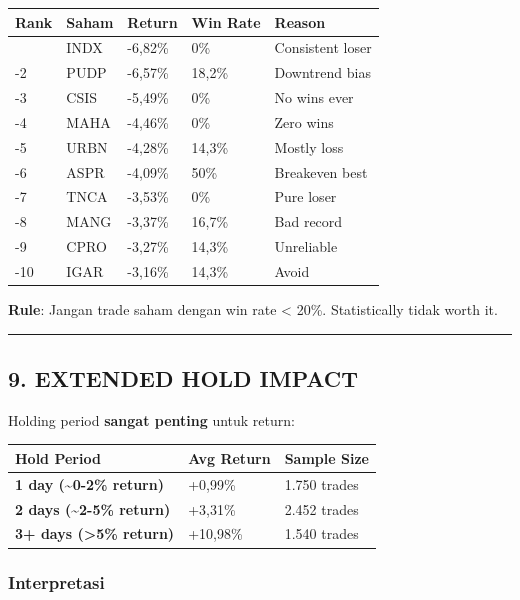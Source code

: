 \documentclass[
  10pt,
  a4paper,
]{article}
\begin{document}
\begin{longtable}[]{@{}lllll@{}}
\toprule\noalign{}
Rank & Saham & Return & Win Rate & Reason \\
\midrule\noalign{}
\endhead
\bottomrule\noalign{}
\endlastfoot
-1 & INDX & -6,82\% & 0\% & Consistent loser \\
-2 & PUDP & -6,57\% & 18,2\% & Downtrend bias \\
-3 & CSIS & -5,49\% & 0\% & No wins ever \\
-4 & MAHA & -4,46\% & 0\% & Zero wins \\
-5 & URBN & -4,28\% & 14,3\% & Mostly loss \\
-6 & ASPR & -4,09\% & 50\% & Breakeven best \\
-7 & TNCA & -3,53\% & 0\% & Pure loser \\
-8 & MANG & -3,37\% & 16,7\% & Bad record \\
-9 & CPRO & -3,27\% & 14,3\% & Unreliable \\
-10 & IGAR & -3,16\% & 14,3\% & Avoid \\
\end{longtable}

\textbf{Rule}: Jangan trade saham dengan win rate \textless{} 20\%.
Statistically tidak worth it.

\begin{center}\rule{0.5\linewidth}{0.5pt}\end{center}

\subsection{9. EXTENDED HOLD IMPACT}\label{extended-hold-impact}

Holding period \textbf{sangat penting} untuk return:

\begin{longtable}[]{@{}lll@{}}
\toprule\noalign{}
Hold Period & Avg Return & Sample Size \\
\midrule\noalign{}
\endhead
\bottomrule\noalign{}
\endlastfoot
\textbf{1 day (\textasciitilde0-2\% return)} & +0,99\% & 1.750 trades \\
\textbf{2 days (\textasciitilde2-5\% return)} & +3,31\% & 2.452
trades \\
\textbf{3+ days (\textgreater5\% return)} & +10,98\% & 1.540 trades \\
\end{longtable}

\subsubsection{Interpretasi}\label{interpretasi}
\end{document}
